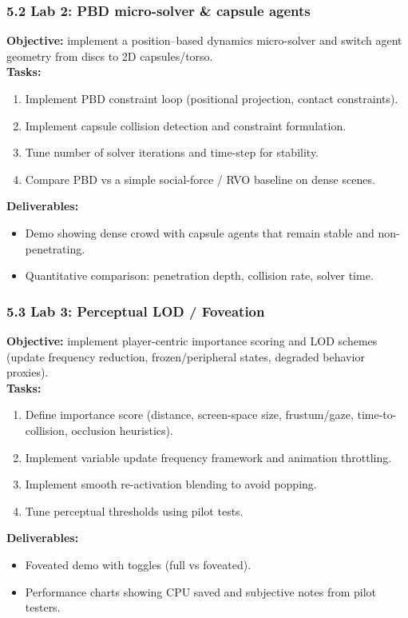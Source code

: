 \subsubsection*{5.2 Lab 2: PBD micro-solver \& capsule agents}
\textbf{Objective:} implement a position–based dynamics micro-solver and switch agent geometry from discs to 2D capsules/torso.\\
\textbf{Tasks:}
\begin{enumerate}[itemsep=0pt]
  \item Implement PBD constraint loop (positional projection, contact constraints).
  \item Implement capsule collision detection and constraint formulation.
  \item Tune number of solver iterations and time-step for stability.
  \item Compare PBD vs a simple social-force / RVO baseline on dense scenes.
\end{enumerate}
\textbf{Deliverables:}
\begin{itemize}[itemsep=0pt]
  \item Demo showing dense crowd with capsule agents that remain stable and non-penetrating.
  \item Quantitative comparison: penetration depth, collision rate, solver time.
\end{itemize}

\subsubsection*{5.3 Lab 3: Perceptual LOD / Foveation}
\textbf{Objective:} implement player-centric importance scoring and LOD schemes (update frequency reduction, frozen/peripheral states, degraded behavior proxies).\\
\textbf{Tasks:}
\begin{enumerate}[itemsep=0pt]
  \item Define importance score (distance, screen-space size, frustum/gaze, time-to-collision, occlusion heuristics).
  \item Implement variable update frequency framework and animation throttling.
  \item Implement smooth re-activation blending to avoid popping.
  \item Tune perceptual thresholds using pilot tests.
\end{enumerate}
\textbf{Deliverables:}
\begin{itemize}[itemsep=0pt]
  \item Foveated demo with toggles (full vs foveated).
  \item Performance charts showing CPU saved and subjective notes from pilot testers.
\end{itemize}

